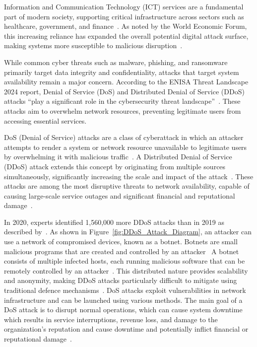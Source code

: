 Information and Communication Technology (ICT) services are a fundamental part
of modern society, supporting critical infrastructure across sectors such as
healthcare, government, and finance~\cite{noauthor_world_nodate}. As noted by the World
Economic Forum, this increasing reliance has expanded the overall potential digital attack
surface, making systems more susceptible to malicious disruption~\cite{noauthor_global_nodate}.

While common cyber threats such as malware, phishing, and ransomware primarily
target data integrity and confidentiality, attacks that target system
availability remain a major concern. According to the ENISA Threat Landscape
2024 report, Denial of Service (DoS) and Distributed Denial of Service (DDoS)
attacks ``play a significant role in the cybersecurity threat landscape''~\cite{noauthor_enisa_2025}. These attacks aim to overwhelm network resources,
preventing legitimate users from accessing essential services.

DoS (Denial of Service) attacks are a class of cyberattack in which an attacker attempts to render a system or network resource unavailable to legitimate users by overwhelming it with malicious traffic~\cite{su_comprehensive_2024}. A Distributed Denial of Service (DDoS) attack extends this concept by originating from multiple sources simultaneously, significantly increasing the scale and impact of the attack~\cite{abiramasundari_distributed_2025}. These attacks are among the most disruptive threats to network availability, capable of causing large-scale service outages and significant financial and reputational damage~\cite{bergamini_de_neira_distributed_nodate}.

In 2020, experts identified 1,560,000 more DDoS attacks than in 2019 as described by~\cite{bergamini_de_neira_distributed_nodate}. As shown in Figure~\ref{fig:DDoS_Attack_Diagram}, an attacker can use a network of compromised devices, known as a botnet. Botnets are small malicious programs that are created and controlled by an attacker~\cite{a_mims_botnet_2025} A botnet consists of multiple infected hosts, each running malicious software that can be remotely controlled by an attacker~\cite{a_mims_botnet_2025}. This distributed nature provides scalability and anonymity, making DDoS attacks particularly difficult to mitigate using traditional defence mechanisms~\cite{panicker_botnets_2008}. DoS attacks exploit vulnerabilities in network
infrastructure and can be launched using various methods. The main goal of a DoS attack is to disrupt normal operations, which can cause system downtime which results in service interruptions, revenue loss, and damage to the organization's reputation and cause downtime and potentially inflict financial or reputational damage~\cite{noauthor_what_2025}.


